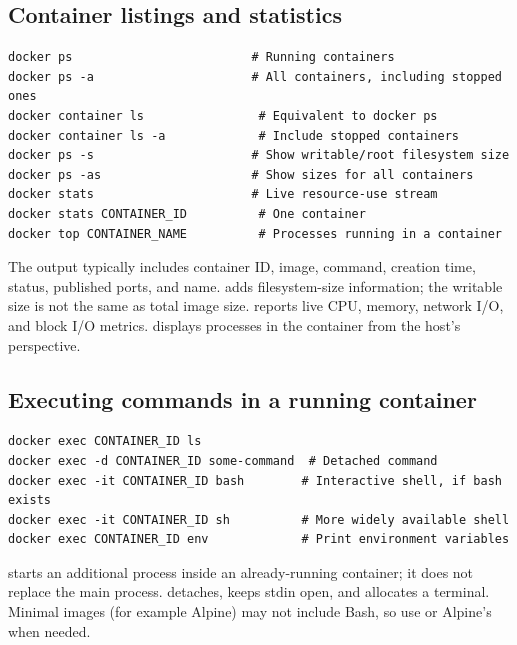 \documentclass[11pt,a4paper]{article}
\newcommand{\cmd}[1]{\texttt{\detokenize{#1}}}
\begin{document}
\subsection{Container listings and statistics}
\begin{lstlisting}
docker ps                         # Running containers
docker ps -a                      # All containers, including stopped ones
docker container ls                # Equivalent to docker ps
docker container ls -a             # Include stopped containers
docker ps -s                      # Show writable/root filesystem size
docker ps -as                     # Show sizes for all containers
docker stats                      # Live resource-use stream
docker stats CONTAINER_ID          # One container
docker top CONTAINER_NAME          # Processes running in a container
\end{lstlisting}
The \cmd{ps} output typically includes container ID, image, command, creation time, status, published ports, and name. \cmd{-s} adds filesystem-size information; the writable size is not the same as total image size. \cmd{stats} reports live CPU, memory, network I/O, and block I/O metrics. \cmd{top} displays processes in the container from the host's perspective.

\subsection{Executing commands in a running container}
\begin{lstlisting}
docker exec CONTAINER_ID ls
docker exec -d CONTAINER_ID some-command  # Detached command
docker exec -it CONTAINER_ID bash        # Interactive shell, if bash exists
docker exec -it CONTAINER_ID sh          # More widely available shell
docker exec CONTAINER_ID env             # Print environment variables
\end{lstlisting}
\cmd{exec} starts an additional process inside an already-running container; it does not replace the main process. \cmd{-d} detaches, \cmd{-i} keeps stdin open, and \cmd{-t} allocates a terminal. Minimal images (for example Alpine) may not include Bash, so use \cmd{sh} or Alpine's \cmd{ash} when needed.
\end{document}

